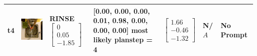 \begin{longtable}{| V{0.8cm} | V{2.6cm} | V{1.6cm} | V{2.1cm} | V{1.55cm} | V{1.6cm} | V{3.2cm} |}
t4 &
\includegraphics[width=\linewidth]{fig/system/_slow2-rinse2_.jpg} &
RINSE
\linebreak\linebreak
$\begin{bmatrix}
0 \\
0.05 \\
-1.85
\end{bmatrix}$ &
[0.00, 0.00, 0.00, 0.01, 0.98, 0.00, 0.00, 0.00] most likely planstep = 4 &
$\begin{bmatrix}
1.66 \\
-0.46 \\
-1.32
\end{bmatrix}$ &
N/$A$ &
No Prompt
\\ \hline



\end{longtable}
